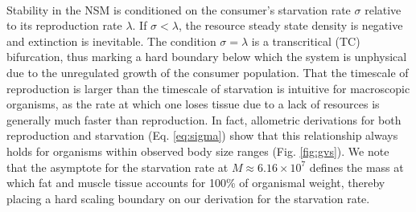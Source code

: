 \documentclass{pnastwo}
\begin{document}
\begin{article}

\vspace{2mm}
 \\ \noindent
Stability in the NSM is conditioned on the consumer's starvation rate $\sigma$ relative to its reproduction rate $\lambda$.
If $\sigma<\lambda$, the resource steady state density is negative and extinction is inevitable.
The condition $\sigma = \lambda$ is a transcritical (TC) bifurcation, thus marking a hard boundary below which the system is unphysical due to the unregulated growth of the consumer population.
That the timescale of reproduction is larger than the timescale of starvation is intuitive for macroscopic organisms, as the rate at which one loses tissue due to a lack of resources is generally much faster than reproduction.
In fact, allometric derivations for both reproduction \cite{Kempes:2012hy} and starvation (Eq. \ref{eq:sigma}) show that this relationship always holds for organisms within observed body size ranges (Fig. \ref{fig:gvs}).
We note that the asymptote for the starvation rate at $M \approx 6.16\times10^7$ defines the mass at which fat and muscle tissue accounts for 100\% of organismal weight, thereby placing a hard scaling boundary on our derivation for the starvation rate.

%
%





\end{article}
\end{document}
